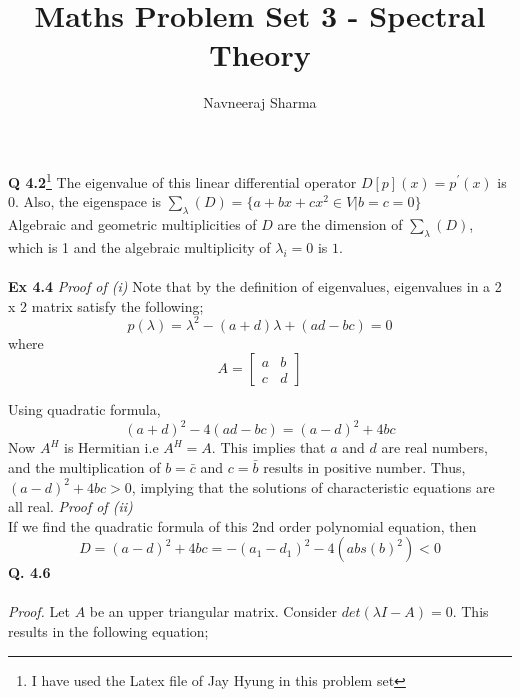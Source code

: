 \documentclass[letterpaper,12pt]{article}
\title{Maths Problem Set 3 - Spectral Theory}
\author{Navneeraj Sharma }
\theoremstyle{definition}
\begin{document}
  \maketitle {}
  \author{}
  \date{}

\textbf{Q 4.2}\footnote{I have used the Latex file of Jay Hyung in this problem set}
The eigenvalue of this linear differential operator $D[p](x) = p^{'} (x)$ is $0$. Also, the eigenspace is $ \sum_{\lambda}(D) = \{a + bx + c x^2 \in V | b=c=0\}$ \\
Algebraic and geometric multiplicities of $D$ are the dimension of $ \sum_{\lambda}(D)$, which is 1 and the algebraic multiplicity of $\lambda_i = 0$ is $1$. \\\\
\textbf{Ex 4.4}
\emph{Proof of (i) }
Note that by the definition of eigenvalues, eigenvalues in a 2 x 2 matrix satisfy the following;
\[p(\lambda)  = \lambda^2 - (a+d) \lambda + (ad - bc) = 0\]
where
\[A= \begin{bmatrix}
  a & b \\
  c & d
\end{bmatrix}\]

Using quadratic formula,
\[(a+d)^2 - 4(ad - bc) = (a-d)^2 + 4bc \]
Now $A^H$ is Hermitian i.e $A^H = A$. This implies that $a$ and $d$ are real numbers, and the multiplication of $b=\bar{c}$ and $c=\bar{b}$ results in positive number. Thus, $(a-d)^2 + 4bc >0$, implying that the solutions of characteristic equations are all real.
\newline
\emph{Proof of (ii)} \\
If we find the quadratic formula of this 2nd order polynomial equation, then
\[D = (a-d)^2 + 4bc = -(a_1 - d_1)^2 - 4(abs(b)^2) < 0 \]
\newline
\textbf{Q. 4.6} \\\\
\emph{Proof.} Let $A$ be an upper triangular matrix. Consider $det(\lambda I - A) = 0 $. This results in the following equation;
\end{document}
